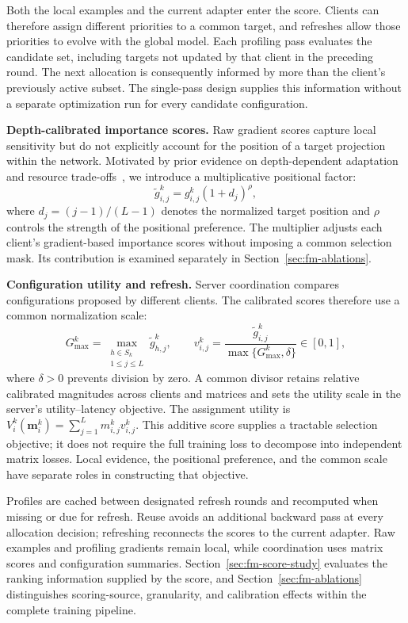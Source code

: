 \documentclass[10pt,conference,letterpaper]{IEEEtran}
\begin{document}
Both the local examples and the current adapter enter the score. Clients can therefore assign different priorities to a common target, and refreshes allow those priorities to evolve with the global model. Each profiling pass evaluates the candidate set, including targets not updated by that client in the preceding round. The next allocation is consequently informed by more than the client's previously active subset. The single-pass design supplies this information without a separate optimization run for every candidate configuration.

\noindent\textbf{Depth-calibrated importance scores.}
Raw gradient scores capture local sensitivity but do not explicitly account for the position of a target projection within the network. Motivated by prior evidence on depth-dependent adaptation and resource trade-offs~\cite{liu2025legend}, we introduce a multiplicative positional factor:
\begin{equation}
 \widetilde g_{i,j}^k=g_{i,j}^k(1+d_j)^{\rho},
 \label{eq:depth}
\end{equation}
where $d_j=(j-1)/(L-1)$ denotes the normalized target position and $\rho$ controls the strength of the positional preference. The multiplier adjusts each client's gradient-based importance scores without imposing a common selection mask. Its contribution is examined separately in Section~\ref{sec:fm-ablations}.

\noindent\textbf{Configuration utility and refresh.}
Server coordination compares configurations proposed by different clients. The calibrated scores therefore use a common normalization scale:
\begin{equation}
 G_{\max}^k=\max_{\substack{h\in S_k\\1\le j\le L}}\widetilde g_{h,j}^k,
 \qquad v_{i,j}^k=
 \frac{\widetilde g_{i,j}^k}{\max\{G_{\max}^k,\delta\}}\in[0,1],
 \label{eq:normalization}
\end{equation}
where $\delta>0$ prevents division by zero. A common divisor retains relative calibrated magnitudes across clients and matrices and sets the utility scale in the server's utility--latency objective. The assignment utility is
$V_i^k(\mathbf m_i^k)=\sum_{j=1}^{L}m_{i,j}^kv_{i,j}^k$.
This additive score supplies a tractable selection objective; it does not require the full training loss to decompose into independent matrix losses. Local evidence, the positional preference, and the common scale have separate roles in constructing that objective.

Profiles are cached between designated refresh rounds and recomputed when missing or due for refresh. Reuse avoids an additional backward pass at every allocation decision; refreshing reconnects the scores to the current adapter. Raw examples and profiling gradients remain local, while coordination uses matrix scores and configuration summaries. Section~\ref{sec:fm-score-study} evaluates the ranking information supplied by the score, and Section~\ref{sec:fm-ablations} distinguishes scoring-source, granularity, and calibration effects within the complete training pipeline.
\end{document}
